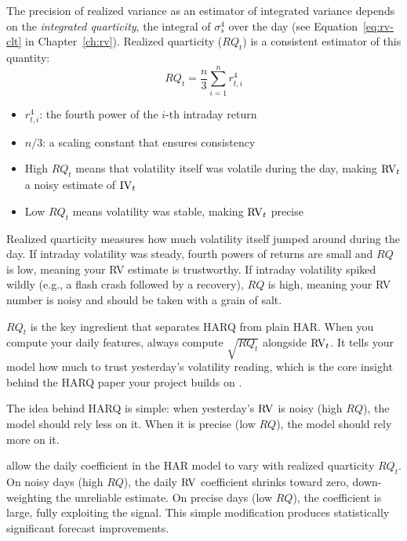 \begin{prereq}
The precision of realized variance as an estimator of integrated variance depends on the \emph{integrated quarticity}, the integral of $\sigma^4_s$ over the day (see Equation~\ref{eq:rv-clt} in Chapter~\ref{ch:rv}).
Realized quarticity ($RQ_t$) is a consistent estimator of this quantity:
\begin{equation}
  RQ_t = \frac{n}{3} \sum_{i=1}^{n} r^4_{t,i}
  \label{eq:rq}
\end{equation}
\begin{itemize}[nosep]
  \item $r^4_{t,i}$: the fourth power of the $i$-th intraday return
  \item $n/3$: a scaling constant that ensures consistency
  \item High $RQ_t$ means that volatility itself was volatile during the day, making $\operatorname{RV}_t$ a noisy estimate of $\operatorname{IV}_t$
  \item Low $RQ_t$ means volatility was stable, making $\operatorname{RV}_t$ precise
\end{itemize}
\end{prereq}

\begin{intuition}
Realized quarticity measures how much volatility itself jumped around during the day.
If intraday volatility was steady, fourth powers of returns are small and $RQ$ is low, meaning your RV estimate is trustworthy.
If intraday volatility spiked wildly (e.g., a flash crash followed by a recovery), $RQ$ is high, meaning your RV number is noisy and should be taken with a grain of salt.
\end{intuition}

\begin{projectconnection}
$RQ_t$ is the key ingredient that separates HARQ from plain HAR.
When you compute your daily features, always compute $\sqrt{RQ_t}$ alongside $\operatorname{RV}_t$.
It tells your model how much to trust yesterday's volatility reading, which is the core insight behind the HARQ paper your project builds on \citep{BPQ2016}.
\end{projectconnection}

The idea behind HARQ is simple: when yesterday's $\operatorname{RV}$ is noisy (high $RQ$), the model should rely less on it.
When it is precise (low $RQ$), the model should rely more on it.

\begin{keyresult}
\citet{BPQ2016} allow the daily coefficient in the HAR model to vary with realized quarticity $RQ_t$.
On noisy days (high $RQ$), the daily $\operatorname{RV}$ coefficient shrinks toward zero, down-weighting the unreliable estimate.
On precise days (low $RQ$), the coefficient is large, fully exploiting the signal.
This simple modification produces statistically significant forecast improvements.
\end{keyresult}

